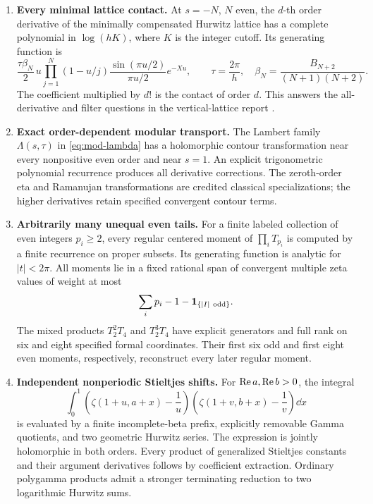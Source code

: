 \begin{enumerate}[label=\textbf{\arabic*.},leftmargin=*]
\item \textbf{Every minimal lattice contact.}
At \(s=-N\), \(N\) even, the \(d\)-th order derivative of the
minimally compensated Hurwitz lattice has a complete polynomial
in \(\log(hK)\), where \(K\) is the integer cutoff. Its generating
function is
\[
 \frac{\tau\beta_N}{2}\,
 u\prod_{j=1}^{N}(1-u/j)
 \frac{\sin(\pi u/2)}{\pi u/2}e^{-Xu},
 \qquad
 \tau=\frac{2\pi}{h},\quad
 \beta_N=\frac{B_{N+2}}{(N+1)(N+2)}.
\]
The coefficient multiplied by \(d!\) is the contact of order \(d\).
This answers the all-derivative and filter questions in the
vertical-lattice report \cite{RepoVertical}.

\item \textbf{Exact order-dependent modular transport.}
The Lambert family \(\Lambda(s,\tau)\) in
\eqref{eq:mod-lambda}
has a holomorphic contour transformation near every
nonpositive even order and near \(s=1\).
An explicit trigonometric polynomial recurrence produces all
derivative corrections. The zeroth-order eta and Ramanujan
transformations are credited classical specializations;
the higher derivatives retain specified convergent contour terms.

\item \textbf{Arbitrarily many unequal even tails.}
For a finite labeled collection of even integers \(p_i\ge2\),
every regular centered moment of
\(\prod_iT_{p_i}\) is computed by a finite recurrence on proper
subsets. Its generating function is analytic for \(|t|<2\pi\).
All moments lie in a fixed rational span of convergent multiple
zeta values of weight at most
\[
 \sum_i p_i-1-\mathbf1_{\{|I|\ {\rm odd}\}}.
\]
The mixed products \(T_2^2T_4\) and \(T_2^3T_4\) have explicit
generators and full rank on six and eight specified formal
coordinates. Their first six odd and first eight even moments,
respectively, reconstruct every later regular moment.

\item \textbf{Independent nonperiodic Stieltjes shifts.}
For \(\operatorname{Re} a,\operatorname{Re} b>0\), the integral
\[
 \int_0^1
   \left(\zeta(1+u,a+x)-\frac1u\right)
   \left(\zeta(1+v,b+x)-\frac1v\right)\dd x
\]
is evaluated by a finite incomplete-beta prefix, explicitly
removable Gamma quotients, and two geometric Hurwitz series.
The expression is jointly holomorphic in both orders.
Every product of generalized Stieltjes constants and their
argument derivatives follows by coefficient extraction.
Ordinary polygamma products admit a stronger terminating
reduction to two logarithmic Hurwitz sums.


\end{enumerate}
